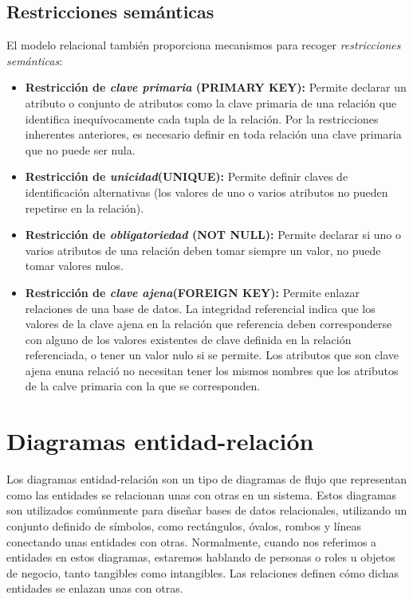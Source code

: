 \subsection{Restricciones semánticas}
El modelo relacional también proporciona mecanismos para recoger \emph{restricciones semánticas}:
\begin{itemize}
    \item \textbf{Restricción de \textit{clave primaria} (PRIMARY KEY): }Permite declarar un atributo o conjunto de atributos como la clave primaria de una relación que identifica inequívocamente cada tupla de la relación. Por la restricciones inherentes anteriores, es necesario definir en toda relación una clave primaria que no puede ser nula.
    \item \textbf{Restricción de \textit{unicidad}(UNIQUE): }Permite definir claves de identificación alternativas (los valores de uno o varios atributos no pueden repetirse en la relación).
    \item \textbf{Restricción de \textit{obligatoriedad} (NOT NULL): }Permite declarar si uno o varios atributos de una relación deben tomar siempre un valor, no puede tomar valores nulos.
    \item \textbf{Restricción de \textit{clave ajena}(FOREIGN KEY): }Permite enlazar relaciones de una base de datos. La integridad referencial indica que los valores de la clave ajena en la relación que referencia deben corresponderse con alguno de los valores existentes de clave definida en la relación referenciada, o tener un valor nulo si se permite. Los atributos que son clave ajena enuna relació no necesitan tener los mismos nombres que los atributos de la calve primaria con la que se corresponden.
\end{itemize}

\section{Diagramas entidad-relación}
Los diagramas entidad-relación son un tipo de diagramas de flujo que representan como las entidades se relacionan unas con otras en un sistema\cite{lc:erd}. Estos diagramas son utilizados comúnmente para diseñar bases de datos relacionales, utilizando un conjunto definido de símbolos, como rectángulos, óvalos, rombos y líneas conectando unas entidades con otras.
Normalmente, cuando nos referimos a entidades en estos diagramas, estaremos hablando de personas o roles u objetos de negocio, tanto tangibles como intangibles. Las relaciones definen cómo dichas entidades se enlazan unas con otras.

